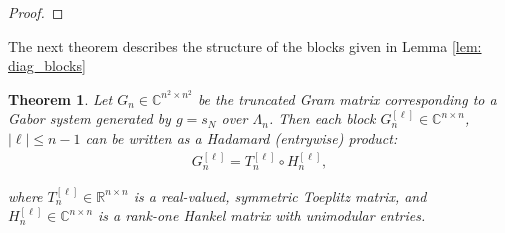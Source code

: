\documentclass{article}
\newcommand{\R}{\mathbb{R}}
\newcommand{\C}{\mathbb{C}}
\newtheorem{theorem}{Theorem}[section]
\begin{document}
\begin{proof}




\end{proof}





The next theorem describes the structure of the blocks given in Lemma \ref{lem: diag_blocks}


\begin{theorem} \label{thm:offdiagTH}
Let $G_n\in \mathbb{C}^{n^2\times n^2}$ be the truncated Gram matrix corresponding to a Gabor system generated by $g=s_N$ over $\Lambda_n$. Then each block $G_n^{[\ell]}\in \mathbb{C}^{n\times n}$, $|\ell|\leq n-1$ can be written as a Hadamard (entrywise) product:
\begin{align}
G_n^{[\ell]} = T_n^{[\ell]} \circ H_n^{[\ell]},\label{eqn:gram:toeplitz-dot-hankel}    
\end{align}

where $T_n^{[\ell]} \in \R^{n\times n}$ is a real-valued, symmetric Toeplitz matrix, and $H_n^{[\ell]}\in \C^{n\times n}$ is a rank-one Hankel matrix with unimodular entries.
\end{theorem}
\end{document}
